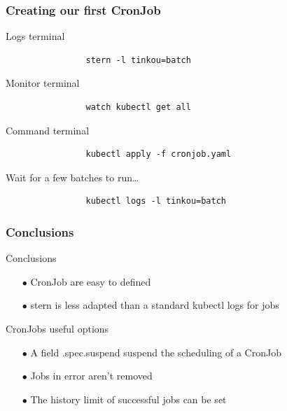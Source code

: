 	\begin{frame}[fragile]
		\frametitle{Creating our first CronJob}
		
		\begin{block}{Logs terminal}
			\begin{verbatim}
				stern -l tinkou=batch
			\end{verbatim}
		\end{block}
		
		\begin{block}{Monitor terminal}
			\begin{verbatim}
				watch kubectl get all
			\end{verbatim}
		\end{block}
		
		\begin{block}{Command terminal}
			\begin{verbatim}
				kubectl apply -f cronjob.yaml
			\end{verbatim}
			Wait for a few batches to run…
			\begin{verbatim}
				kubectl logs -l tinkou=batch
			\end{verbatim}
		\end{block}
	\end{frame}

	\begin{frame}
		\frametitle{Conclusions}
		
		\begin{block}{Conclusions}
			\begin{itemize}
				\item[$\bullet$] CronJob are easy to defined
				\item[$\bullet$] stern is less adapted than a standard kubectl logs for jobs
			\end{itemize}
		\end{block}
		
		\begin{block}{CronJobs useful options}
			\begin{itemize}
				\item[$\bullet$] A field .spec.suspend suspend the scheduling of a CronJob
				\item[$\bullet$] Jobs in error aren't removed
				\item[$\bullet$] The history limit of successful jobs can be set
			\end{itemize}
		
		\end{block}
	\end{frame}
	
